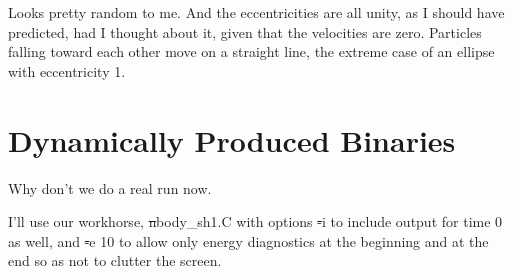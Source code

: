 \bob
Looks pretty random to me.  And the eccentricities are all unity, as
I should have predicted, had I thought about it, given that the
velocities are zero.  Particles falling toward each other move on a
straight line, the extreme case of an ellipse with eccentricity 1.

\cba

\section{Dynamically Produced Binaries}

\abc

\carol
Why don't we do a real run now.

\bob
I'll use our workhorse, {\st nbody\_sh1.C} with options {\st -i} to include
output for time 0 as well, and {\st -e 10} to allow only energy diagnostics
at the beginning and at the end so as not to clutter the screen.

\cba

